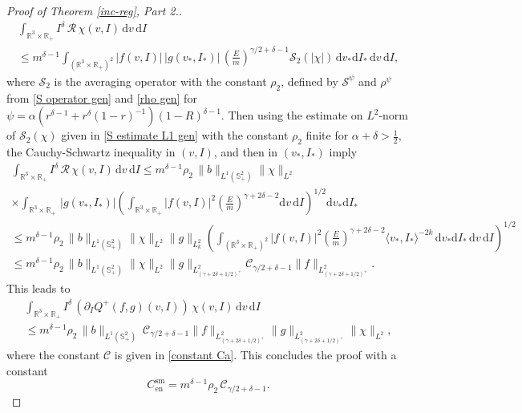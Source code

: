 \documentclass[11pt,a4paper]{amsart}
\newcommand{\bRp}{\mathbb{R}_+}
\newcommand{\bRfp}{\mathbb{R}^3 \times \bRp}
\newcommand{\bSp}{\mathbb{S}^2_+}
\newcommand{\mS}{\mathcal{S}}
\newcommand{\md}{\mathrm{d}}
\newcommand{\g}{\gamma}
\newcommand{\la}{\langle}
\newcommand{\ra}{\rangle}
\newcommand{\Ls}{L^1}
\newcommand{\E}{\left(\frac{E}{m}\right)}
\newcommand{\test}{I^\delta}
\newcommand{\dvvs}{  \md v_* \md I_* \, \md v \, \md I}
\newcommand{\RI}{\mathcal{R}}
\newcommand{\Csen}{C_{\text{en}}^{\text{sm}}}
\begin{document}
\begin{proof}[Proof of Theorem \ref{inc-reg}, Part 2.]
\begin{multline*}
	\int_{ \bRfp } \test \, \RI \, \chi(v,I) \, \md v \, \md I 
\\	 \leq m^{\delta-1} \int_{(\bRfp)^2} | f(v,I) | \, | g(v_*,I_*) |  \,  \E^{\g/2+\delta-1} 	\mS_2(|\chi|) \,	\dvvs,
\end{multline*}
where $\mS_2$  is the averaging operator with the constant $\rho_2$,  defined by $\mS^\psi$ and $\rho^\psi$  from   \eqref{S operator gen} and \eqref{rho gen} for   $\psi= \alpha \left( r^{\delta - 1 }   + {r^\delta}{(1-r)^{-1}} \right) \left(1-R\right)^{\delta-1}$. Then using the estimate on $L^2$-norm of $	\mS_2(\chi) $ given in  \eqref{S estimate L1 gen} with   the constant $\rho_2$ finite for $ \alpha+\delta>\frac{1}{2}$, 
the Cauchy-Schwartz inequality in $(v,I)$, and then in $(v_*,I_*)$ imply
\begin{multline*}
	\int_{\bRfp} \test \, \RI \, \chi(v,I) \, \md v \, \md I 
		 \leq   m^{\delta-1}   \rho_2 \,   \| b \|_{\Ls(\bSp)}   \| \chi\|_{L^{2}}  \\ \times \int_{\bRfp} \, |g(v_*,I_*)|  \left( \int_{\bRfp}  |f(v,I)|^2   \E^{\g+2\delta-2}  \md v\, \md I \right)^{1/2}	 	\md v_* \md I_*\\
		 	 \leq    m^{\delta-1}   \rho_2 \,   \| b \|_{\Ls(\bSp)}   \| \chi\|_{L^{2}}\| g\|_{L^2_k}  \left( \int_{(\bRfp)^2}  |f(v,I)|^2   \E^{\g+2\delta-2} \la v_*, I_*\ra^{-2k} \,  \dvvs \right)^{1/2}
		 	 \\
		 	 \leq  m^{\delta-1}   \rho_2 \,   \| b \|_{\Ls(\bSp)}   \| \chi\|_{L^{2}}   \| g\|_{L^2_{(\g+2\delta+1/2)^+}} \mathcal{C}_{\g/2+\delta-1}  \| f\|_{L^2_{(\g+2\delta+1/2)^+}}.
\end{multline*}
This leads to 
	\begin{multline}
	\int_{\bRfp} \test \, \left(\partial_{I}		Q^+(f,g)(v,I) \right) \, \chi(v,I) \, \md v \, \md I 
	\\
	\leq  m^{\delta-1}   \rho_2 \,   \| b \|_{\Ls(\bSp)}\  \mathcal{C}_{\g/2+\delta-1}  \| f\|_{L^2_{(\g+2\delta+1/2)^+}}    \| g\|_{L^2_{(\g+2\delta+1/2)^+}}    \| \chi\|_{L^{2}},
\end{multline}
where  the constant $\mathcal{C}$ is given in \eqref{constant Ca}. This concludes the proof with a constant
\begin{equation}\label{C smooth I}
	\Csen =  m^{\delta-1}   \rho_2 \,    \mathcal{C}_{\g/2+\delta-1}. 
\end{equation}

\end{proof}

 
\end{document}
